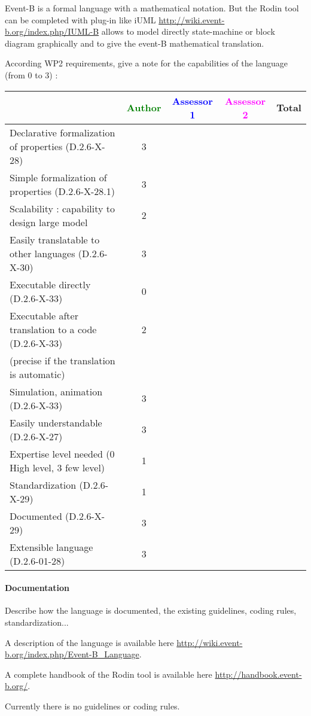 \begin{author_comment}
Event-B  is a formal language with a mathematical notation. But the Rodin tool can be completed with plug-in like iUML \url{http://wiki.event-b.org/index.php/IUML-B} allows to model directly state-machine or block diagram  graphically and to  give the event-B mathematical translation.
\end{author_comment}

According WP2 requirements, give a note for the capabilities of the language (from 0 to 3) :

\begin{tabular}{|l | c | c | c | c|}
\hline
& \textcolor{green}{Author} & \textcolor{blue}{Assessor 1} & \textcolor{magenta}{Assessor 2} & Total \\
\hline
Declarative formalization of properties (D.2.6-X-28) & 3 & & & \\
\hline
Simple formalization of properties (D.2.6-X-28.1) & 3 & & & \\
\hline
Scalability : capability to design large model & 2 & & & \\
\hline
Easily translatable to other languages (D.2.6-X-30) & 3 & & & \\
\hline
Executable directly (D.2.6-X-33) & 0 & & & \\
\hline
Executable after translation to a code (D.2.6-X-33) & 2 & & & \\
(precise if the translation is automatic) & & & & \\
\hline
Simulation, animation (D.2.6-X-33) & 3 & & & \\
\hline
Easily understandable (D.2.6-X-27) & 3 & & & \\
\hline
Expertise level needed (0 High level, 3 few level) & 1 & & & \\
\hline
Standardization (D.2.6-X-29) & 1 & & & \\
\hline
Documented (D.2.6-X-29) & 3 & & & \\
\hline
Extensible language (D.2.6-01-28) & 3 & & & \\
\hline
\end{tabular}


\paragraph{Documentation} Describe how the language is documented, the existing guidelines, coding rules, standardization...

\begin{author_comment}
A description of the language is available here \url{http://wiki.event-b.org/index.php/Event-B_Language}.

A complete handbook of the Rodin tool is available  here \url{http://handbook.event-b.org/}.

Currently there is no guidelines or coding rules.
\end{author_comment}

